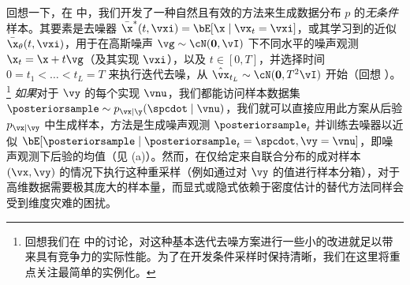 \documentclass[../../book-main_zh.tex]{subfiles}
\begin{document}
回想一下，在  中，我们开发了一种自然且有效的方法来生成数据分布 $p$ 的\textit{无条件}样本。其要素是去噪器 $\bar{\x}^\ast(t, \vxi) = \bE[ \x \mid
\vx_t=\vxi ]$，或其学习到的近似 $\bar{\x}_{\theta}(t, \vxi)$，用于在高斯噪声 $\vg \sim \cN(\mathbf{0}, \vI)$ 下不同水平的噪声观测 $\x_t = \x + t \vg$（及其实现 $\vxi$），以及 $t \in
[0, T]$，并选择时间 $0 = t_1 < \hdots < t_{L} = T$ 来执行迭代去噪，从 $\hat{\vx}_{t_L} \sim
\cN(\mathbf{0}, T^2 \vI)$ 开始（回想 ）。\footnote{回想我们在  中的讨论，对这种基本迭代去噪方案进行一些小的改进就足以带来具有竞争力的实际性能。为了在开发条件采样时保持清晰，我们在这里将重点关注最简单的实例化。}
\textit{如果}对于 $\vy$ 的每个实现 $\vnu$，我们都能访问样本数据集 $\posteriorsample \sim p_{\vx \mid \y}(\spcdot \mid \vnu)$，我们就可以直接应用此方案从后验 $p_{\vx \mid \vy}$ 中生成样本，方法是生成噪声观测 $\posteriorsample_t$ 并训练去噪器以近似 $\bE[
\posteriorsample \mid \posteriorsample_t=\spcdot, \vy=\vnu ]$，即噪声观测下后验的均值（见 (a)）。然而，在仅给定来自联合分布的成对样本 $(\vx,
\vy)$ 的情况下执行这种重采样（例如通过对 $\vy$ 的值进行样本分箱），对于高维数据需要极其庞大的样本量，而显式或隐式依赖于密度估计的替代方法同样会受到维度灾难的困扰。
\end{document}

